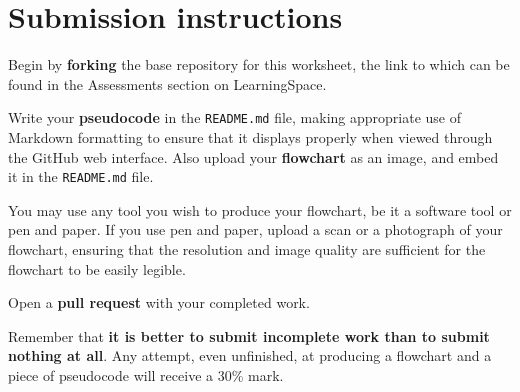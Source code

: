 \documentclass{../../../fal_assignment}
\begin{document}
\section*{Submission instructions}

Begin by \textbf{forking} the base repository for this worksheet, the link to which can be found in the Assessments section on LearningSpace.

Write your \textbf{pseudocode} in the \texttt{README.md} file,
making appropriate use of Markdown formatting to ensure that it displays properly when viewed through the GitHub web interface.
Also upload your \textbf{flowchart} as an image, and embed it in the \texttt{README.md} file.

You may use any tool you wish to produce your flowchart,
be it a software tool or pen and paper.
If you use pen and paper, upload a scan or a photograph of your flowchart,
ensuring that the resolution and image quality are sufficient for the flowchart to be easily legible.

Open a \textbf{pull request} with your completed work.

Remember that \textbf{it is better to submit incomplete work than to submit nothing at all}.
Any attempt, even unfinished, at producing a flowchart and a piece of pseudocode will receive a 30\% mark.
\end{document}
